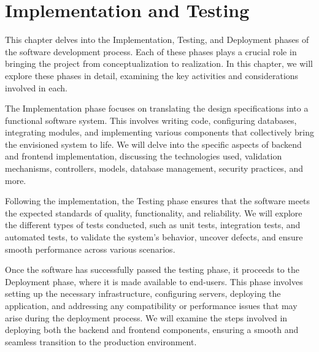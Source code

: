 \chapter{Implementation and Testing}

\begin{justify}
    This chapter delves into the Implementation, Testing, and Deployment phases of the software development process. Each of these phases plays a crucial role in bringing the project from conceptualization to realization. In this chapter, we will explore these phases in detail, examining the key activities and considerations involved in each.


    \vspace{0.25cm}
    \newendline The Implementation phase focuses on translating the design specifications into a functional software system. This involves writing code, configuring databases, integrating modules, and implementing various components that collectively bring the envisioned system to life. We will delve into the specific aspects of backend and frontend implementation, discussing the technologies used, validation mechanisms, controllers, models, database management, security practices, and more.


    \vspace{0.25cm}
    \newendline Following the implementation, the Testing phase ensures that the software meets the expected standards of quality, functionality, and reliability. We will explore the different types of tests conducted, such as unit tests, integration tests, and automated tests, to validate the system's behavior, uncover defects, and ensure smooth performance across various scenarios.


    \vspace{0.25cm}
    \newendline Once the software has successfully passed the testing phase, it proceeds to the Deployment phase, where it is made available to end-users. This phase involves setting up the necessary infrastructure, configuring servers, deploying the application, and addressing any compatibility or performance issues that may arise during the deployment process. We will examine the steps involved in deploying both the backend and frontend components, ensuring a smooth and seamless transition to the production environment.
\end{justify}
\clearpage






